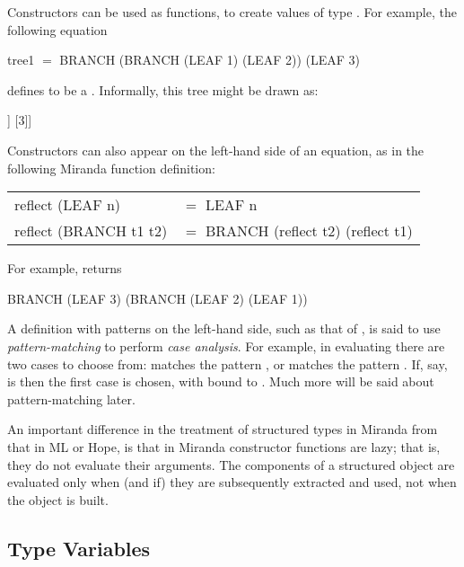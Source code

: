 Constructors can be used as functions, to create values of type . For example, the following equation
\begin{mlcoded}
    tree1 $=$ BRANCH (BRANCH (LEAF 1) (LEAF 2)) (LEAF 3)
\end{mlcoded}
defines  to be a . Informally, this tree might be drawn as:
\begin{mlcoded}
\begin{center}
    \begin{forest}
        [. [. [1] [2]] [3]]
    \end{forest}
\end{center}
\end{mlcoded}

Constructors can also appear on the left-hand side of an equation, as in the following Miranda function definition:
\begin{mlcoded}
    \begin{tabular}{ll}
    reflect (LEAF n) &$=$ LEAF n \\
    reflect (BRANCH t1 t2) &$=$ BRANCH (reflect t2) (reflect t1)
    \end{tabular}
\end{mlcoded}
For example,  returns
\begin{mlcoded}
    BRANCH (LEAF 3) (BRANCH (LEAF 2) (LEAF 1))
\end{mlcoded}

A definition with patterns on the left-hand side, such as that of , is said to use \textit{pattern-matching} to perform \textit{case analysis}. For example, in evaluating  there are two cases to choose from:  matches the pattern , or  matches the pattern . If, say,  is  then the first case is chosen, with  bound to . Much more will be said about pattern-matching later.

An important difference in the treatment of structured types in Miranda from that in ML or Hope, is that in Miranda constructor functions are lazy; that is, they do not evaluate their arguments. The components of a structured object are evaluated only when (and if) they are subsequently extracted and used, not when the object is built.

\subsection{Type Variables}

